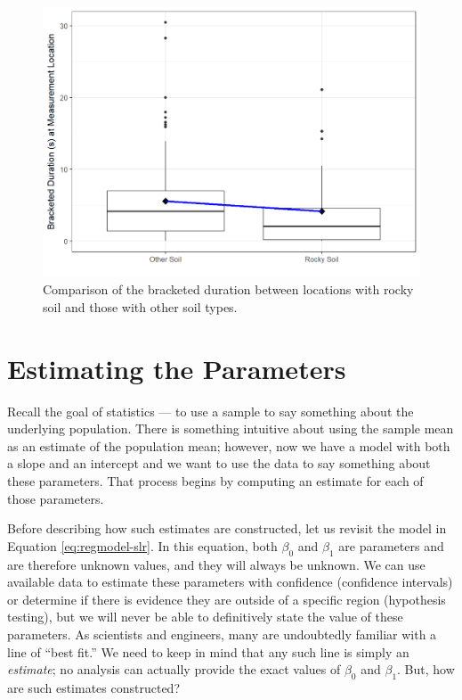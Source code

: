 \documentclass[]{book}
\theoremstyle{plain}
\theoremstyle{mydefn}
\theoremstyle{myexmpl}
\theoremstyle{remark}
\begin{document}
\begin{figure}

{\centering \includegraphics[width=0.8\linewidth]{./Images/regmodel-ind-plot-1} 

}

\caption{Comparison of the bracketed duration between locations with rocky soil and those with other soil types.}\label{fig:regmodel-ind-plot}
\end{figure}

\section{Estimating the Parameters}\label{estimating-the-parameters}

Recall the goal of statistics --- to use a sample to say something about
the underlying population. There is something intuitive about using the
sample mean as an estimate of the population mean; however, now we have
a model with both a slope and an intercept and we want to use the data
to say something about these parameters. That process begins by
computing an estimate for each of those parameters.

Before describing how such estimates are constructed, let us revisit the
model in Equation \eqref{eq:regmodel-slr}. In this equation, both
\(\beta_0\) and \(\beta_1\) are parameters and are therefore unknown
values, and they will always be unknown. We can use available data to
estimate these parameters with confidence (confidence intervals) or
determine if there is evidence they are outside of a specific region
(hypothesis testing), but we will never be able to definitively state
the value of these parameters. As scientists and engineers, many are
undoubtedly familiar with a line of ``best fit.'' We need to keep in
mind that any such line is simply an \emph{estimate}; no analysis can
actually provide the exact values of \(\beta_0\) and \(\beta_1\). But,
how are such estimates constructed?
\end{document}
